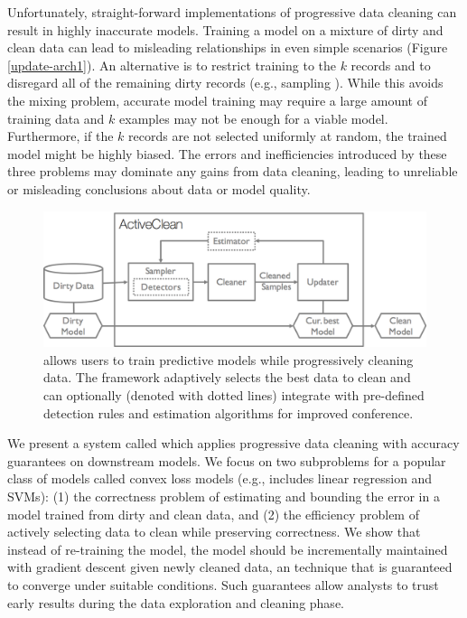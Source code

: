 Unfortunately, straight-forward implementations of progressive data cleaning can result in highly inaccurate models.
Training a model on a mixture of dirty and clean data can lead to misleading relationships in even simple scenarios (Figure \ref{update-arch1}).
An alternative is to restrict training to the $k$ records and to disregard all of the remaining dirty records (e.g., sampling \cite{wang1999sample}).
While this avoids the mixing problem, accurate model training may require a large amount of training data and $k$ examples may not be enough for a viable model.
Furthermore, if the $k$ records are not selected uniformly at random, the trained model might be highly biased.
The errors and inefficiencies introduced by these three problems may dominate any gains from data cleaning, leading to unreliable or misleading conclusions about data or model quality.

\begin{figure}[t]
\centering
 \includegraphics[width=\columnwidth]{figs/arch.png}
 \caption{\sysfull allows users to train predictive models while progressively cleaning data. The framework adaptively selects the best data to clean and can optionally (denoted with dotted lines) integrate with pre-defined detection rules and estimation algorithms for improved conference. \label{sys-arch}}\vspace{-2em}
\end{figure}

We present a system called \sys which applies progressive data cleaning with accuracy guarantees on downstream models.
We focus on two subproblems for a popular class of models called convex loss models (e.g., includes linear regression and SVMs): (1) the correctness problem of estimating and bounding the error in a model trained from dirty and clean data, and (2) the efficiency problem of actively selecting data to clean while preserving correctness.
We show that instead of re-training the model, the model should be incrementally maintained with gradient descent given newly cleaned data, an technique that is guaranteed to converge under suitable conditions.
Such guarantees allow analysts to trust early results during the data exploration and cleaning phase.

